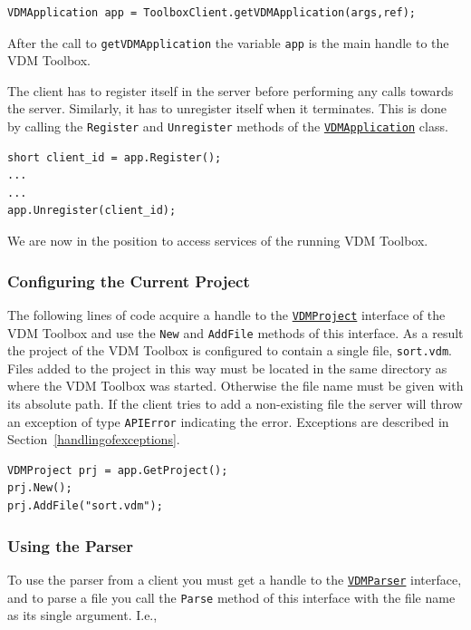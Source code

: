 \documentclass[\pformat,12pt]{article}
\newcommand{\VDMApplication}{\hyperlink{interface.VDMApplication}{VDMApplication}}
\newcommand{\VDMParser}{\hyperlink{interface.VDMParser}{VDMParser}}
\newcommand{\VDMProject}{\hyperlink{interface.VDMProject}{VDMProject}}
\begin{document}
\begin{verbatim}
VDMApplication app = ToolboxClient.getVDMApplication(args,ref);
\end{verbatim}

After the call to {\tt getVDMApplication} the variable {\tt app} is the main
handle to the VDM Toolbox.

The client has to register itself in the server before performing any
calls towards the server. Similarly, it has to unregister itself
when it terminates. This is done by calling the  {\tt Register} and
{\tt Unregister} methods of the {\tt \VDMApplication} class. 

\begin{verbatim}
short client_id = app.Register();
...
...
app.Unregister(client_id);
\end{verbatim}

We are now in the position to access services of the running VDM Toolbox.

\subsubsection{Configuring the Current Project}

The following lines of code acquire a handle to the {\tt \VDMProject}
interface of the VDM Toolbox and use the {\tt New} and {\tt AddFile} methods of
this interface. As a result the project of the VDM Toolbox is
configured to contain a single file, {\tt sort.vdm}. Files added to the
project in this way must be located in the same directory as where the
VDM Toolbox was started. Otherwise the file name must be given with
its absolute path. If the client tries to add a non-existing file the
server will throw an exception of type {\tt APIError} indicating the error.
Exceptions are described in Section~\ref{handlingofexceptions}.

\begin{verbatim}
VDMProject prj = app.GetProject();
prj.New();
prj.AddFile("sort.vdm");
\end{verbatim}

\subsubsection{Using the Parser}

To use the parser from a client you must get a handle to the {\tt \VDMParser}
interface, and to parse a file you call the {\tt Parse} method of this
interface with the file name as its single argument. I.e.,
\end{document}
